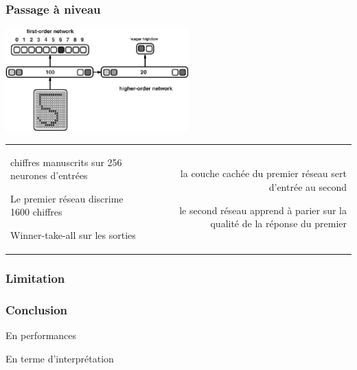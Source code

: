 \documentclass[11pt]{beamer}
\newenvironment{noitemize}
{\begin{list}{}{%
\setlength{\labelwidth}{0em}%
\setlength{\labelsep}{2pt}%
\setlength{\leftmargin}{0pt}%
\renewcommand{\makelabel}{\small\color{cloneBlue}{\textbullet}}}}%
{\end{list}}
\newenvironment{minusitemize}
{\begin{list}{}{%
\setlength{\labelwidth}{0em}%
\setlength{\labelsep}{2pt}%
\setlength{\leftmargin}{-20pt}%
\renewcommand{\makelabel}{\small\color{cloneBlue}{\textbullet}}}}%
{\end{list}}
\begin{document}
\begin{frame}\transwipe
  \frametitle{Passage à niveau}
  \begin{center}
  \includegraphics[height=150px]{base.png}
  \end{center}

  \begin{center}
  \begin{tabular}{lr}
  \begin{minipage}{150px}
    
    \footnotesize\begin{minusitemize}
     \item chiffres manuscrits sur 256 neurones d'entrées
     \item Le premier réseau discrime 1600 chiffres
     \item Winner-take-all sur les sorties
    \end{minusitemize}

    \end{minipage}
    &
    \begin{minipage}{170px}
    \footnotesize\begin{noitemize}
     \item la couche cachée du premier réseau sert d'entrée au second
     \item le second réseau apprend à parier sur la qualité de la réponse du premier
    \end{noitemize}
    
    \end{minipage}
  \end{tabular}

  \end{center}
  
\end{frame}

\begin{frame}\transwipe
  \frametitle{Limitation}

\end{frame}

\begin{frame}\transwipe
  \frametitle{Conclusion}
 En performances
 
 En terme d'interprétation
\end{frame}
\end{document}
